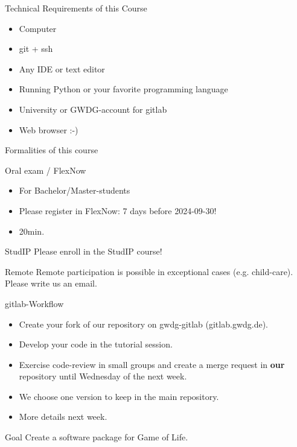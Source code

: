 \documentclass[aspectratio=169,graphics,handout]{beamer}
\begin{document}
\begin{frame}{Technical Requirements of this Course}
    \begin{itemize}
        \item Computer
        \item git + ssh
        \item Any IDE or text editor
        \item Running Python or your favorite programming language
        \item University or GWDG-account for gitlab
        \item Web browser :-)
    \end{itemize}

\end{frame}


\begin{frame}{Formalities of this course}

    \begin{block}{Oral exam / FlexNow}
        \begin{itemize}
            \item For Bachelor/Master-students
            \item Please register in FlexNow: 7 days before 2024-09-30!
            \item 20min.
        \end{itemize}
    \end{block}

    \pause

    \begin{block}{StudIP}
        Please enroll in the StudIP course!
    \end{block}

    \pause

    \begin{block}{Remote}
        Remote participation is possible in exceptional cases (e.g. child-care). Please write us an email.
    \end{block}

\end{frame}

\begin{frame}{gitlab-Workflow}
    \begin{itemize}
        \item Create your fork of our repository on gwdg-gitlab (gitlab.gwdg.de).
        \item Develop your code in the tutorial session.
        \item Exercise code-review in small groups and create a merge request in \textbf{our} repository until Wednesday of the next week.
        \item We choose one version to keep in the main repository.
        \item More details next week.
    \end{itemize}

    \pause
    \begin{block}{Goal}
        Create a software package for Game of Life.
    \end{block}

\end{frame}
\end{document}
